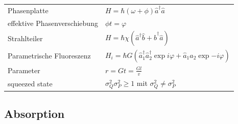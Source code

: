 \documentclass[12pt,a4paper]{article}
\renewcommand{\=}[1]{\stackrel{#1}{=}}
\theoremstyle{definition}
\theoremstyle{remark}
\begin{document}
\begin{minipage}[t]{.49\linewidth}
\vspace{0pt}
\noindent\begin{tabular}{ll}
Phasenplatte & $H = \hbar (\omega + \phi) \hat a^\dagger \hat a$\\
effektive Phasenverschiebung & $\phi t = \varphi$\\
Strahlteiler & $H = \hbar \chi (\hat a^\dagger \hat b + \hat b^\dagger \hat a)$\\
Parametrische Fluoreszenz & $H_i = \hbar G (\hat a_1^\dagger \hat a_2^\dagger \exp{i \varphi} + \hat a_1 \hat a_2 \exp{-i \varphi})$\\
Parameter & $r = Gt = \frac{G l}{v}$\\
squeezed state & $\sigma_Q^2 \sigma_P^2 \geq 1$ mit $\sigma_Q^2 \neq \sigma_P^2$\\
\end{tabular}
\end{minipage}%
\begin{minipage}[t]{.49\linewidth}
\vspace{0pt}

\end{minipage}

\subsection{Absorption}
\end{document}
